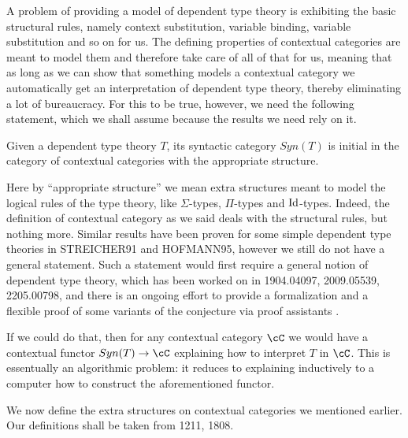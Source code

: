 A problem of providing a model of dependent type theory is exhibiting the
basic structural rules, namely context substitution, variable binding,
variable substitution and so on for us. The defining properties of contextual
categories are meant to model them and therefore 
take care of all of that for us, meaning that as long
as we can show that something models a contextual category we automatically get
an interpretation of dependent type theory, thereby eliminating a lot of
bureaucracy. For this to be true, however, we need the following statement,
which we shall assume because the results we need rely on it.

\begin{conj}[Initiality]
  Given a dependent type theory $T$, its syntactic category $Syn(T)$ is initial
  in the category of contextual categories with the appropriate structure.
\end{conj}

Here by ``appropriate structure'' we mean extra structures meant to model the
logical rules of the type theory, like $\Sigma$-types, $\Pi$-types and
$\operatorname{Id}$-types. Indeed, the definition of contextual category as we said deals with
the structural rules, but nothing more.
Similar results have been proven for some simple dependent type theories in
STREICHER91 and HOFMANN95, however we still do not have a general statement.
Such a statement would first require a general notion of dependent type
theory, which has been worked on in 1904.04097, 2009.05539, 2205.00798, and
there is an ongoing effort to provide a formalization and a flexible proof of
some variants of the conjecture via proof assistants .

If we could do that, then for any contextual category $\cC$ we would have a
contextual functor $Syn(T)\rightarrow\cC$ explaining how to interpret $T$ in
$\cC$. This is essentually an algorithmic problem: it reduces to explaining
inductively to a computer how to construct the aforementioned functor.

We now define the extra structures on contextual categories we mentioned
earlier. Our definitions shall be taken from 1211, 1808.

